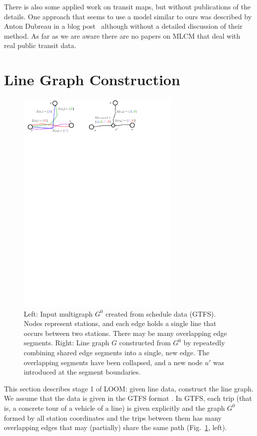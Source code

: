 \documentclass[format=acmsmall, review=false, screen=true]{acmart}
\begin{document}
There is also some applied work on transit maps, but without publications of the details.
One approach that seems to use a model similar to ours was described by Anton Dubreau in a blog post~\cite{dub16} although without a detailed discussion of their method. As far as we are aware there are no papers on MLCM that deal with real public transit data.

%
\section{Line Graph Construction}\label{SEC:graph}
%
\begin{figure}[t]
  \centering
  \includegraphics[width=0.7\textwidth]{figures/linegraph.pdf}
  \caption{Left: Input multigraph $G^0$ created from schedule data (GTFS). Nodes represent stations, and each edge holds a single line that occurs between two stations. There may be many overlapping edge segments. Right: Line graph $G$ constructed from $G^0$ by repeatedly combining shared edge segments into a single, new edge. The overlapping segments have been collapsed, and a new node $u'$ was introduced at the segment boundaries.}  
  \label{FIG:linegraph}
\end{figure}

This section describes stage 1 of LOOM: given line data, construct the line graph.
We assume that the data is given in the GTFS format \cite{gtfs}.
In GTFS, each trip (that is, a concrete tour of a vehicle of a line) is given explicitly and the graph $G^0$ formed by all station coordinates and the trips between them has many overlapping edges that may (partially) share the same path (Fig.~\ref{FIG:linegraph}, left).
\end{document}
